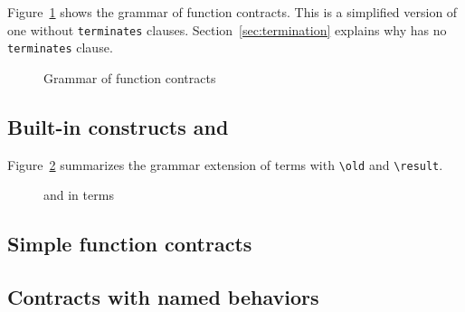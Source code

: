 
Figure~\ref{fig:gram:contracts} shows the grammar of function contracts. This is
a simplified version of \acsl one without \lstinline|terminates|
clauses. Section~\ref{sec:termination} explains why \eacsl has no
\lstinline|terminates| clause.

\begin{figure}[htbp]
  \begin{cadre}
      
   \end{cadre}
    \caption{Grammar of function contracts}
  \label{fig:gram:contracts}
\end{figure}


\subsection{Built-in constructs %
  \texorpdfstring{\old}{\textbackslash{}old} %
 and \texorpdfstring{\result}{\textbackslash{}result}}
\label{sec:builtinconstructs}

\nodiff

Figure~\ref{fig:gram:oldandresult} summarizes the grammar extension of terms
with \lstinline|\old| and \lstinline|\result|.
\begin{figure}[htbp]
  \begin{cadre}
      
    \end{cadre}
    \caption{\protect\old and \protect\result in terms}
  \label{fig:gram:oldandresult}
\end{figure}


\subsection{Simple function contracts}
\label{sec:simplecontracts}

\nodiff



\subsection{Contracts with named behaviors}
\label{subsec:behaviors}

